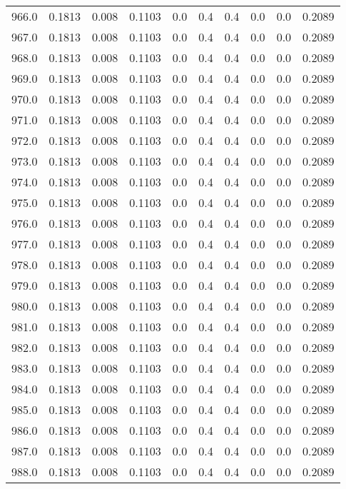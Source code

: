 \begin{longtable}{lrrrrrrrrr}
966.0 & 0.1813 & 0.008 & 0.1103 & 0.0 & 0.4 & 0.4 & 0.0 & 0.0 & 0.2089 \\
967.0 & 0.1813 & 0.008 & 0.1103 & 0.0 & 0.4 & 0.4 & 0.0 & 0.0 & 0.2089 \\
968.0 & 0.1813 & 0.008 & 0.1103 & 0.0 & 0.4 & 0.4 & 0.0 & 0.0 & 0.2089 \\
969.0 & 0.1813 & 0.008 & 0.1103 & 0.0 & 0.4 & 0.4 & 0.0 & 0.0 & 0.2089 \\
970.0 & 0.1813 & 0.008 & 0.1103 & 0.0 & 0.4 & 0.4 & 0.0 & 0.0 & 0.2089 \\
971.0 & 0.1813 & 0.008 & 0.1103 & 0.0 & 0.4 & 0.4 & 0.0 & 0.0 & 0.2089 \\
972.0 & 0.1813 & 0.008 & 0.1103 & 0.0 & 0.4 & 0.4 & 0.0 & 0.0 & 0.2089 \\
973.0 & 0.1813 & 0.008 & 0.1103 & 0.0 & 0.4 & 0.4 & 0.0 & 0.0 & 0.2089 \\
974.0 & 0.1813 & 0.008 & 0.1103 & 0.0 & 0.4 & 0.4 & 0.0 & 0.0 & 0.2089 \\
975.0 & 0.1813 & 0.008 & 0.1103 & 0.0 & 0.4 & 0.4 & 0.0 & 0.0 & 0.2089 \\
976.0 & 0.1813 & 0.008 & 0.1103 & 0.0 & 0.4 & 0.4 & 0.0 & 0.0 & 0.2089 \\
977.0 & 0.1813 & 0.008 & 0.1103 & 0.0 & 0.4 & 0.4 & 0.0 & 0.0 & 0.2089 \\
978.0 & 0.1813 & 0.008 & 0.1103 & 0.0 & 0.4 & 0.4 & 0.0 & 0.0 & 0.2089 \\
979.0 & 0.1813 & 0.008 & 0.1103 & 0.0 & 0.4 & 0.4 & 0.0 & 0.0 & 0.2089 \\
980.0 & 0.1813 & 0.008 & 0.1103 & 0.0 & 0.4 & 0.4 & 0.0 & 0.0 & 0.2089 \\
981.0 & 0.1813 & 0.008 & 0.1103 & 0.0 & 0.4 & 0.4 & 0.0 & 0.0 & 0.2089 \\
982.0 & 0.1813 & 0.008 & 0.1103 & 0.0 & 0.4 & 0.4 & 0.0 & 0.0 & 0.2089 \\
983.0 & 0.1813 & 0.008 & 0.1103 & 0.0 & 0.4 & 0.4 & 0.0 & 0.0 & 0.2089 \\
984.0 & 0.1813 & 0.008 & 0.1103 & 0.0 & 0.4 & 0.4 & 0.0 & 0.0 & 0.2089 \\
985.0 & 0.1813 & 0.008 & 0.1103 & 0.0 & 0.4 & 0.4 & 0.0 & 0.0 & 0.2089 \\
986.0 & 0.1813 & 0.008 & 0.1103 & 0.0 & 0.4 & 0.4 & 0.0 & 0.0 & 0.2089 \\
987.0 & 0.1813 & 0.008 & 0.1103 & 0.0 & 0.4 & 0.4 & 0.0 & 0.0 & 0.2089 \\
988.0 & 0.1813 & 0.008 & 0.1103 & 0.0 & 0.4 & 0.4 & 0.0 & 0.0 & 0.2089 \\

\end{longtable}
